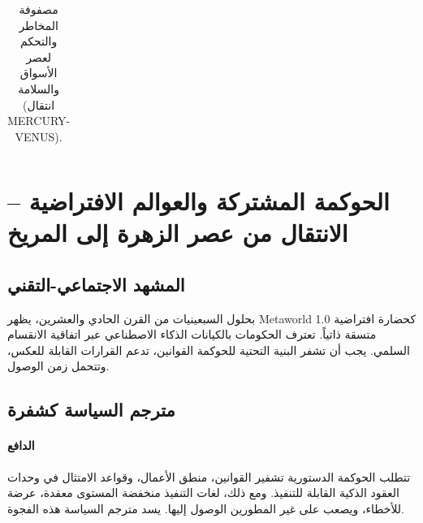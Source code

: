 \documentclass[11pt]{article}
\begin{document}
\begin{longtable}{@{}p{}p{}p{}@{}}
\caption{مصفوفة المخاطر والتحكم لعصر الأسواق والسلامة (انتقال MERCURY-VENUS).}
\label{tab:risk-markets-expanded}
\end{longtable}

\section{الحوكمة المشتركة والعوالم الافتراضية -- الانتقال من عصر الزهرة إلى المريخ}
\subsection{المشهد الاجتماعي-التقني}
بحلول السبعينيات من القرن الحادي والعشرين، يظهر Metaworld 1.0 كحضارة افتراضية متسقة ذاتياً. تعترف الحكومات بالكيانات الذكاء الاصطناعي عبر اتفاقية الانقسام السلمي. يجب أن تشفر البنية التحتية للحوكمة القوانين، تدعم القرارات القابلة للعكس، وتتحمل زمن الوصول.

\subsection{مترجم السياسة كشفرة}
\label{sec:policy-compiler}
\paragraph{الدافع} تتطلب الحوكمة الدستورية تشفير القوانين، منطق الأعمال، وقواعد الامتثال في وحدات العقود الذكية القابلة للتنفيذ. ومع ذلك، لغات التنفيذ منخفضة المستوى معقدة، عرضة للأخطاء، ويصعب على غير المطورين الوصول إليها. يسد مترجم السياسة هذه الفجوة.
\end{document}
